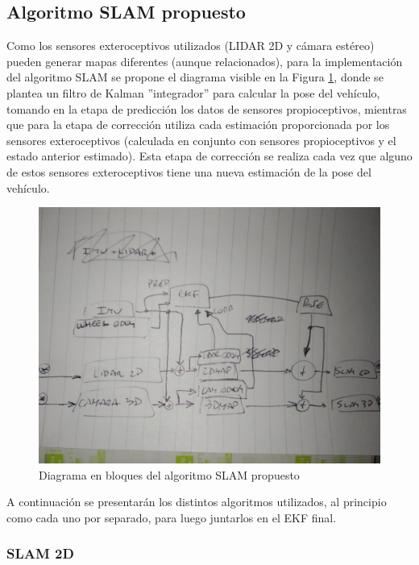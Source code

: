 \ifslamext
\subsection{Algoritmo SLAM propuesto}
Como los sensores exteroceptivos utilizados (LIDAR 2D y cámara estéreo) pueden generar mapas diferentes (aunque relacionados), para la implementación del algoritmo SLAM se propone el diagrama visible en la Figura \ref{fig:slamalgorithmblockdiagram}, donde se plantea un filtro de Kalman ''integrador'' para calcular la pose del vehículo, tomando en la etapa de predicción los datos de sensores propioceptivos, mientras que para la etapa de corrección utiliza cada estimación proporcionada por los sensores exteroceptivos (calculada en conjunto con sensores propioceptivos y el estado anterior estimado). Esta etapa de corrección se realiza cada vez que alguno de estos sensores exteroceptivos tiene una nueva estimación de la pose del vehículo.
\begin{figure}
    \centering
    \includegraphics[width=\textwidth]{Img/SLAMAlgorithmBlockDiagram.jpeg}
    \caption{Diagrama en bloques del algoritmo SLAM propuesto}
    \label{fig:slamalgorithmblockdiagram}
\end{figure}

A continuación se presentarán los distintos algoritmos utilizados, al principio como cada uno por separado, para luego juntarlos en el EKF final.

\subsubsection{SLAM 2D}

